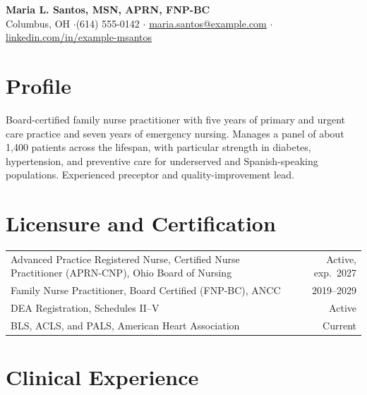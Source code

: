 \documentclass[10pt,letterpaper]{article}
\begin{document}
\begin{center}
  {\LARGE\bfseries Maria L. Santos, MSN, APRN, FNP-BC}\\[4pt]
  Columbus, OH \quad$\cdot$\quad (614) 555-0142 \quad$\cdot$\quad
  \href{mailto:maria.santos@example.com}{maria.santos@example.com} \quad$\cdot$\quad
  \href{https://www.linkedin.com/in/example-msantos}{linkedin.com/in/example-msantos}
\end{center}

\section{Profile}
Board-certified family nurse practitioner with five years of primary and urgent care practice and seven years of emergency nursing. Manages a panel of about 1,400 patients across the lifespan, with particular strength in diabetes, hypertension, and preventive care for underserved and Spanish-speaking populations. Experienced preceptor and quality-improvement lead.

\section{Licensure and Certification}
\begin{tabularx}{\linewidth}{@{}X r@{}}
Advanced Practice Registered Nurse, Certified Nurse Practitioner (APRN-CNP), Ohio Board of Nursing & Active, exp.\ 2027 \\
Family Nurse Practitioner, Board Certified (FNP-BC), ANCC & 2019--2029 \\
DEA Registration, Schedules II--V & Active \\
BLS, ACLS, and PALS, American Heart Association & Current \\
\end{tabularx}

\section{Clinical Experience}
\end{document}
